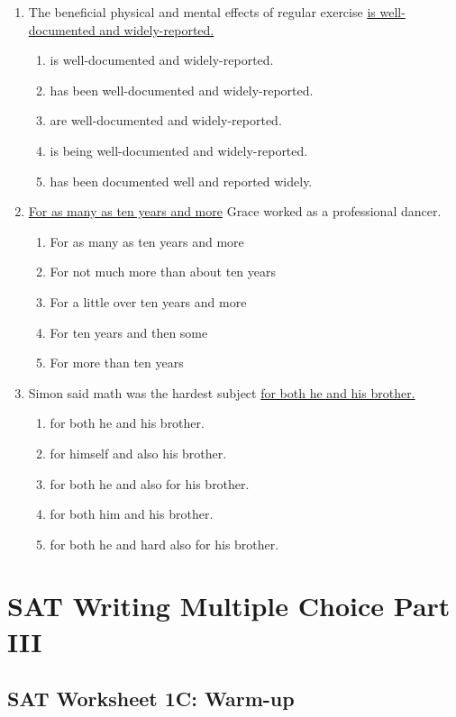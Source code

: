 \documentclass[12pt]{book}
\begin{document}
\begin{enumerate}
\bigskip
\item The beneficial physical and mental effects of regular exercise \ul{is well-documented and widely-reported.} 
\begin{enumerate}[label=(\Alph*)]
\item is well-documented and widely-reported.
\item has been well-documented and widely-reported.
\item are well-documented and widely-reported.
\item is being well-documented and widely-reported.
\item has been documented well and reported widely.
\end{enumerate}

\bigskip
\item \underline{For as many as ten years and more} Grace worked as a professional dancer.
\begin{enumerate}[label=(\Alph*)]
\item For as many as ten years and more
\item For not much more than about ten years 
\item For a little over ten years and more
\item For ten years and then some
\item For more than ten years
\end{enumerate}

\bigskip
\item Simon said math was the hardest subject \underline{for both he and his brother.}
\begin{enumerate}[label=(\Alph*)]
\item for both he and his brother.
\item for himself and also his brother.
\item for both he and also for his brother.
\item for both him and his brother.
\item for both he and hard also for his brother.
\end{enumerate}
\end{enumerate}

\chapter[Multiple Choice Part III]{SAT Writing Multiple Choice Part III}
\section{SAT Worksheet 1C: Warm-up}
\end{document}
